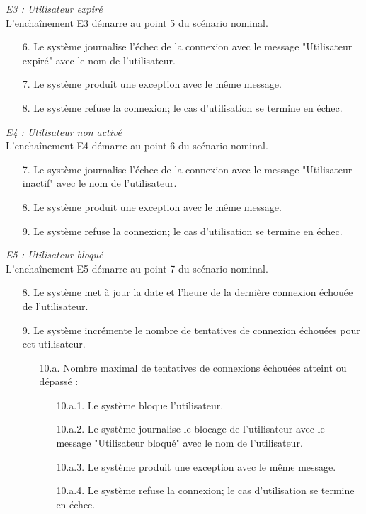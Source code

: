 \textit{E3 : Utilisateur expiré}\\
L’enchaînement E3 démarre au point 5 du scénario nominal.
\begin{itemize}
	\item[6.] Le système journalise l'échec de la connexion avec le message "Utilisateur expiré" avec le nom de l'utilisateur.
	\item[7.] Le système produit une exception avec le même message.
	\item[8.] Le système refuse la connexion; le cas d'utilisation se termine en échec.
\end{itemize}
\textit{E4 : Utilisateur non activé}\\
L’enchaînement E4 démarre au point 6 du scénario nominal.
\begin{itemize}
	\item[7.] Le système journalise l'échec de la connexion avec le message "Utilisateur inactif" avec le nom de l'utilisateur.
	\item[8.] Le système produit une exception avec le même message.
	\item[9.] Le système refuse la connexion; le cas d'utilisation se termine en échec.
\end{itemize}
\textit{E5 : Utilisateur bloqué}\\
L’enchaînement E5 démarre au point 7 du scénario nominal.
\begin{itemize}
	\item[8.] Le système met à jour la date et l'heure de la dernière connexion échouée de l'utilisateur.
	\item[9.] Le système incrémente le nombre de tentatives de connexion échouées pour cet utilisateur.
	\begin{itemize}
		\item[10.a.] Nombre maximal de tentatives de connexions échouées atteint ou dépassé : 
		\begin{itemize}
			\item[10.a.1.] Le système bloque l'utilisateur.
			\item[10.a.2.] Le système journalise le blocage de l'utilisateur avec le message "Utilisateur bloqué" avec le nom de l'utilisateur.
			\item[10.a.3.] Le système produit une exception avec le même message.
			\item[10.a.4.] Le système refuse la connexion; le cas d'utilisation se termine en échec.
		\end{itemize}
	\end{itemize}
\end{itemize}
